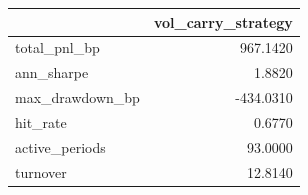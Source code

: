 \begin{tabular}{lr}
\toprule
 & vol\_carry\_strategy \\
\midrule
total\_pnl\_bp & 967.1420 \\
ann\_sharpe & 1.8820 \\
max\_drawdown\_bp & -434.0310 \\
hit\_rate & 0.6770 \\
active\_periods & 93.0000 \\
turnover & 12.8140 \\
\bottomrule
\end{tabular}
